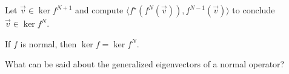 \documentclass{homework}
\begin{document}
\vfill

\begin{problem}
  Let $\vec{v} \in \ker f^{N+1}$ and compute
  $\langle f^\star(f^N(\vec{v})), f^{N-1}(\vec{v}) \rangle$ to conclude $\vec{v} \in \ker f^N$.
\end{problem}

\vfill

\begin{problem}
  If $f$ is normal, then $\ker f = \ker f^N$.
\end{problem}

\vfill

\begin{problem}
  What can be said about the generalized eigenvectors of a normal operator?
\end{problem}

\vfill
\end{document}
